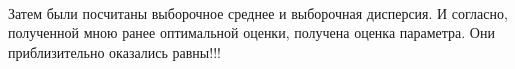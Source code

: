 \documentclass[a4paper,12pt, oneside]{book}
\begin{document}
\begin{figure}[h!]
	\begin{center}
		\begin{minipage}[h]{0.47\linewidth}
			  \\
			\vspace{15mm}
		\end{minipage}
	\end{center}
\end{figure}

Затем были посчитаны выборочное среднее и выборочная дисперсия. И согласно, полученной мною ранее оптимальной оценки, получена оценка параметра. Они приблизительно оказались равны!!!

\begin{figure}[h!]
	\begin{center}
		\begin{minipage}[h]{0.47\linewidth}
			\\
			\vspace{15mm}
		\end{minipage}
		\hfill	
		\begin{minipage}[h]{0.47\linewidth}
			 \\
		\end{minipage}
		\end{center}
\end{figure}
\end{document}
